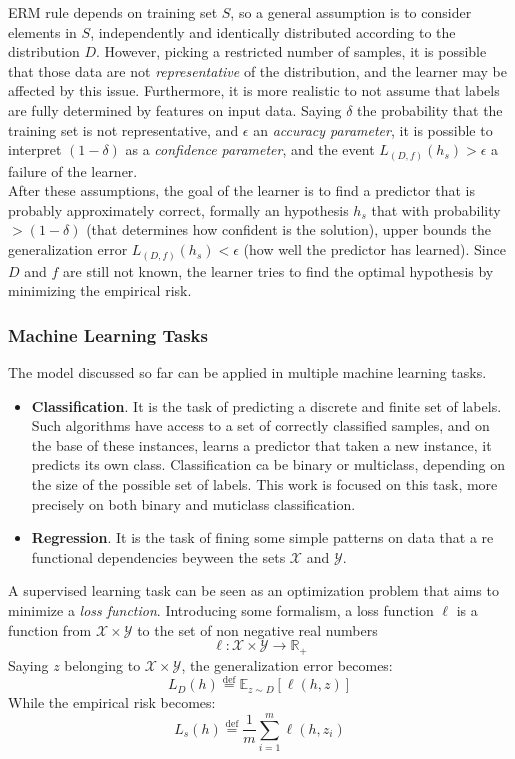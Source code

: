 ERM rule depends on training set $S$, so a general assumption is to consider elements in $S$, independently and identically distributed according to the distribution $D$. However, picking a restricted number of samples, it is possible that those data are not \textit{representative} of the distribution, and the learner may be affected by this issue. Furthermore, it is more realistic to not assume that labels are fully determined by features on input data. Saying $\delta$ the probability that the training set is not representative, and $\epsilon$ an \textit{accuracy parameter}, it is possible to interpret $(1-\delta)$ as a \textit{confidence parameter}, and the event $L_{(D,f)}(h_s) > \epsilon$ a failure of the learner.\\
After these assumptions, the goal of the learner is to find a predictor that is probably approximately correct, formally an hypothesis $h_s$ that with probability $> (1-\delta)$ (that determines how confident is the solution), upper bounds the generalization error $L_{(D,f)}(h_s) < \epsilon$ (how well the predictor has learned). Since $D$ and $f$ are still not known, the learner tries to find the optimal hypothesis by minimizing the empirical risk.\\

\subsubsection{Machine Learning Tasks}
The model discussed so far can be applied in multiple machine learning tasks.
\begin{itemize}
	\item \textbf{Classification}. It is the task of predicting a discrete and finite set of labels. Such algorithms have access to a set of correctly classified samples, and on the base of these instances, learns a predictor that taken a new instance, it predicts its own class. Classification ca be binary or multiclass, depending on the size of the possible set of labels. This work is focused on this task, more precisely on both binary and muticlass classification.
	\item \textbf{Regression}. It is the task of fining some simple patterns on data that a re functional dependencies beyween the sets $\mathcal{X}$ and $\mathcal{Y}$.
\end{itemize}

A supervised learning task can be seen as an optimization problem that aims to minimize a \textit{loss function}. Introducing some formalism, a loss function $\ell$ is a function from $\mathcal{X} \times \mathcal{Y}$ to the set of non negative real numbers
\[\ell: \mathcal{X} \times \mathcal{Y} \rightarrow \mathbb{R}_+\]
Saying $z$ belonging to $\mathcal{X} \times \mathcal{Y}$, the generalization error becomes:
\[L_D(h) \stackrel{\text{def}}{=} \mathbb{E}_{z \sim D}[\ell (h,z)]\]
While the empirical risk becomes:
\[L_s(h)\stackrel{\text{def}}{=} \frac{1}{m} \sum_{i=1}^{m} \ell (h, z_i)\]

